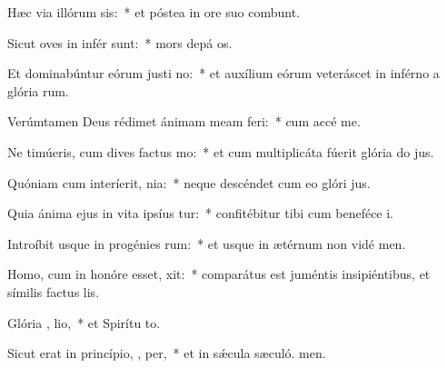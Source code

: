 \item Hæc via illórum  sis:~* et póstea in ore suo combunt.
\item Sicut oves in infér  sunt:~* mors depá os.
\item Et dominabúntur eórum justi  no:~* et auxílium eórum veteráscet in inférno a glória rum.
\item Verúmtamen Deus rédimet ánimam meam   feri:~* cum accé me.
\item Ne timúeris, cum dives factus  mo:~* et cum multiplicáta fúerit glória do jus.
\item Quóniam cum interíerit,   nia:~* neque descéndet cum eo glóri jus.
\item Quia ánima ejus in vita ipsíus tur:~* confitébitur tibi cum beneféce i.
\item Introíbit usque in progénies  rum:~* et usque in ætérnum non vidé men.
\item Homo, cum in honóre esset,  xit:~* comparátus est juméntis insipiéntibus, et símilis factus  lis.
\item Glória ,  lio,~* et Spirítu to.
\item Sicut erat in princípio,  ,  per,~* et in sǽcula sæculó. men.
